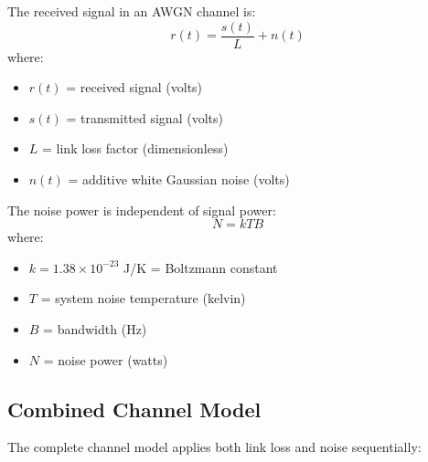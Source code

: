 The received signal in an AWGN channel is:
\begin{equation}
r(t) = \frac{s(t)}{L} + n(t)
\end{equation}
where:
\begin{itemize}
\item $r(t)$ = received signal (volts)
\item $s(t)$ = transmitted signal (volts)
\item $L$ = link loss factor (dimensionless)
\item $n(t)$ = additive white Gaussian noise (volts)
\end{itemize}

The noise power is independent of signal power:
\begin{equation}
N = kTB
\end{equation}
where:
\begin{itemize}
\item $k = 1.38 \times 10^{-23}$ J/K = Boltzmann constant
\item $T$ = system noise temperature (kelvin)
\item $B$ = bandwidth (Hz)
\item $N$ = noise power (watts)
\end{itemize}

\subsection{Combined Channel Model}\label{combined-channel-model}

The complete channel model applies both link loss and noise sequentially:

\begin{center}
\end{center}

